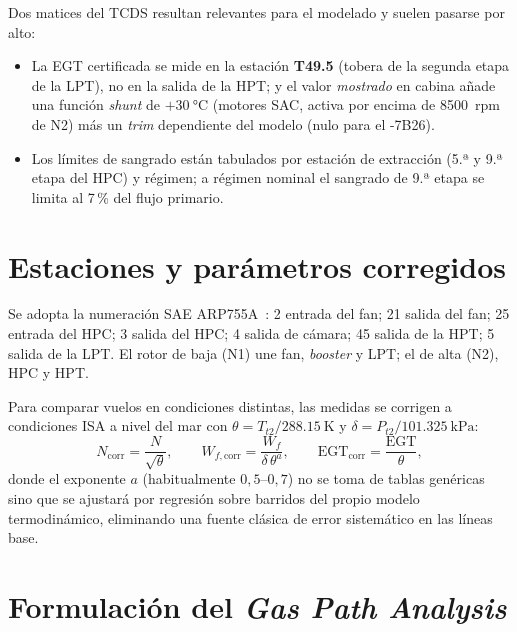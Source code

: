 Dos matices del TCDS resultan relevantes para el modelado y suelen pasarse por alto:
\begin{itemize}
  \item La EGT certificada se mide en la estación \textbf{T49.5} (tobera de la segunda etapa de
    la LPT), no en la salida de la HPT; y el valor \emph{mostrado} en cabina añade una función
    \emph{shunt} de $+\SI{30}{\degreeCelsius}$ (motores SAC, activa por encima de \SI{8500}{rpm} de
    N2) más un \emph{trim} dependiente del modelo (nulo para el -7B26).
  \item Los límites de sangrado están tabulados por estación de extracción (5.ª y 9.ª etapa del
    HPC) y régimen; a régimen nominal el sangrado de 9.ª etapa se limita al 7\,\% del flujo
    primario.
\end{itemize}

\section{Estaciones y parámetros corregidos}
\label{sec:estaciones}

Se adopta la numeración SAE ARP755A~\cite{SAE755}: 2 entrada del fan; 21 salida del fan; 25
entrada del HPC; 3 salida del HPC; 4 salida de cámara; 45 salida de la HPT; 5 salida de la LPT.
El rotor de baja (N1) une fan, \emph{booster} y LPT; el de alta (N2), HPC y HPT.

Para comparar vuelos en condiciones distintas, las medidas se corrigen a condiciones ISA a nivel
del mar con $\theta = T_{t2}/\SI{288.15}{\kelvin}$ y $\delta = P_{t2}/\SI{101.325}{\kilo\pascal}$:
\begin{equation}
  N_{\mathrm{corr}} = \frac{N}{\sqrt{\theta}}, \qquad
  W_{f,\mathrm{corr}} = \frac{W_f}{\delta\,\theta^{a}}, \qquad
  \mathrm{EGT}_{\mathrm{corr}} = \frac{\mathrm{EGT}}{\theta},
\end{equation}
donde el exponente $a$ (habitualmente $0{,}5$--$0{,}7$) no se toma de tablas genéricas sino que
se ajustará por regresión sobre barridos del propio modelo termodinámico, eliminando una fuente
clásica de error sistemático en las líneas base.

\section{Formulación del \emph{Gas Path Analysis}}
\label{sec:gpa}

